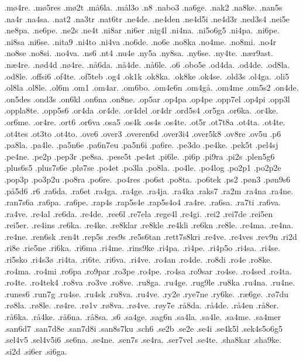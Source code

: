 {.m^^f84re.
.m^^f85res
.m^^f82t
.m^^e56la.
.m^^e5l3o
.n8
.nabo3
.na6ge.
.nak2
.na8ke.
.nan5s
.na4r
.na4sa.
.nat2
.na3tr
.nat6tr
.ne4de.
.ne4den
.ne4d5i
.ne4d3r
.ned3s4
.nei5e
.ne8pa.
.ne6pe.
.ne2s
.ne4t
.ni8ar
.ni6er
.nig4l
.ni4na.
.ni5o6g5
.ni4pa.
.ni6pe.
.ni8sa
.ni6se.
.nita9
.ni4to
.ni4va
.no6de.
.no6e
.no8ka
.no4me.
.no8mi.
.no4r
.no8se
.no8si.
.no4va.
.ns6
.nt4
.nu4e
.ny5a
.ny8sa.
.ny6se.
.ny4te.
.n^^e6r9ast.
.n^^e64re.
.n^^f8d4d
.n^^f84re.
.n^^e56da.
.n^^e54de.
.n^^e56le.
.o6
.obo5e
.od4da.
.od4de.
.od8la.
.od8le.
.offsi6
.of4te.
.of5teb
.og4
.ok1k
.ok8ka.
.ok8ke
.ok4se.
.old3s
.ol4ga.
.oli5
.ol8la
.ol8le.
.ol6m
.om1
.om4ar.
.om6bo.
.om4e6n
.om4g^^e5.
.om4me
.om5s2
.on4de.
.on5des
.ond3s
.on6kl
.on6na
.on8ne.
.op5ar
.op4pa
.op4pe
.opp7el
.op4pi
.opp3l
.oppla8te.
.opp5s6
.or4da
.or4de.
.or4del
.or4dr
.ord5s4
.or5ga
.or6ka.
.or4ke.
.or6me.
.or4re.
.ort6
.or6va
.osa5
.os4k
.os4s
.os4te.
.ot5r
.ot7t8a
.ot4ta.
.ot4te.
.ot4tes
.ot3to
.ot4to.
.ove6
.over3
.overen6d
.over3i4
.over5k8
.ov8re
.ov5u
.p6
.pa8la.
.pa4le.
.pa5n6e
.pa6n7eu
.pa5n6i
.pa6re.
.pe3do
.pe4ke.
.pek5t
.pel4sj
.pe4ne.
.pe2p
.pep3r
.pe8sa.
.pese5t
.pe4st
.pi6le.
.pi6p
.pi9ra
.pi2s
.plen5g6
.plus6s5 
.plus7s6e
.pl^^f87se
.po4et
.po3la
.po8la.
.po4le.
.po4log
.po2p1
.po2p2e
.pop3p
.po3p2u
.po8ra
.po6re.
.po4res
.po6st
.po8ta.
.po6tek
.ps2
.p^^f8n3
.p^^f8n9s6
.p^^e55d6
.r6
.ra6da.
.ra6et
.ra4ga.
.ra4ge.
.ra4ja.
.ra4ka
.raks7
.ra2m
.ra4na
.ra4ne.
.ran7s6a
.ra6pa.
.ra6pe.
.rap4s
.rap5s4e
.rap5s4o4
.ra4re.
.ra6sa.
.ra7ti
.ra6va.
.ra4ve.
.re4al
.re6da.
.re4de.
.ree6l
.re7ela
.rege4l
.re4gi.
.rei2
.rei7de
.rei5en
.rei5er.
.re4ins
.re6ka.
.re4ke.
.re8klar
.re8kle
.re4kli
.re6kn
.re8le.
.re4ma.
.re4na.
.re4ne.
.ren6sk
.ren4t
.rep5s
.res9s
.re5s6tan
.rett7s8kri
.re4ve.
.re4ves
.rev9n
.ri2d
.ri8e
.rie5ne
.ri6ka.
.ri6ma
.ri4me.
.rins9ke
.ri4pa.
.ri4pe.
.ri4p5o
.ri4sa.
.ri4se.
.ri5sko
.ri4s3^^f8
.ri4ta.
.ri6te.
.ri6va.
.ri4ve.
.ro4an
.ro4de.
.ro8di
.ro4e
.ro8ke.
.ro4ma.
.ro4mi
.ro6pa
.ro9par
.ro3pe
.ro4pe.
.ro4sa
.ro9sar
.ro4se.
.ro4sed
.ro4ta.
.ro4te.
.ro4tek4
.ro8va
.ro3ve
.ro8ve.
.ru8ga.
.ru4ge.
.rug9le
.ru8ka
.ru4na.
.ru4ne.
.runes6
.run7g
.ru4se.
.ru4sk
.ru8va.
.ru4ve.
.ry2e
.rye7ne
.ry6ke.
.r^^e66ge.
.r^^f87du
.r^^f88la.
.r^^f88le.
.r^^f84re.
.r^^f81v
.r^^f88va.
.r^^f84ve.
.r^^f8y7e
.r^^e58da.
.r^^e54de.
.r^^e54en
.r^^e58er.
.r^^e56ka.
.r^^e54ke.
.r^^e56na.
.r^^e58sa.
.s6
.sa4ge.
.sag6n
.sa4la.
.sa4le.
.sa4me.
.sa4mer
.san6d7
.san7d8e
.san7d8i
.san8s7ku
.sch6
.se2b
.se2e
.se4i
.se4k5l
.sek4s5o6g5
.sel4v5
.sel4v5i6
.se6na.
.se4ne.
.sen7s
.se4ra.
.ser7vel
.se4te.
.sha8kar
.sha9ke.
.si2d
.si6er
.si6ga.
}
